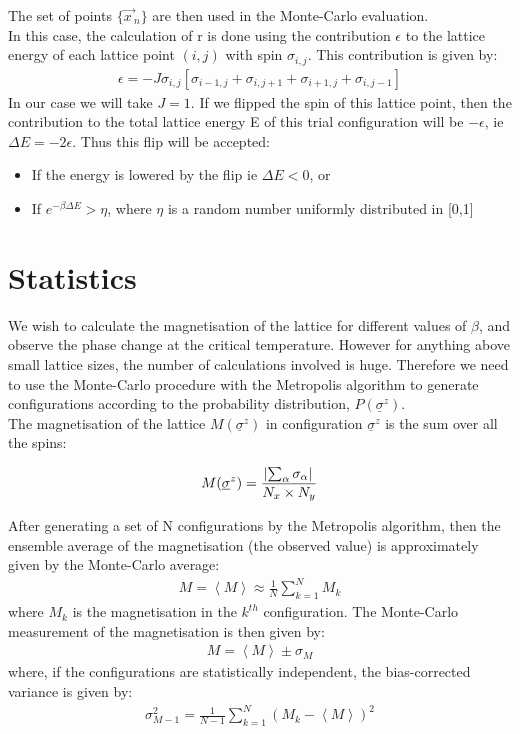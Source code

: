 \documentclass[a4paper]{article}
\begin{document}
\noindent The set of points $\{\overrightarrow{x\,}_n\}$ are then used in the Monte-Carlo evaluation.\\

\noindent In this case, the calculation of r is done using the contribution $\epsilon$ to the lattice energy of each lattice point $(i,j)$ with spin $\sigma_{i,j}$. This contribution is given by:
\begin{align}
	\epsilon=-J\sigma_{i,j}\left[\sigma_{i-1,j}+\sigma_{i,j+1}+\sigma_{i+1,j}+\sigma_{i,j-1}\right] \label{Eq_Metr_Alg_E}
\end{align}
In our case we will take $J=1$. If we flipped the spin of this lattice point, then the contribution to the total lattice energy E of this trial configuration will be $-\epsilon$, ie $\Delta E=-2\epsilon$. Thus this flip will be accepted:
\begin{itemize}
	\item If the energy is lowered by the flip ie $\Delta E<0$, or
	\item If $e^{-\beta\Delta E}>\eta$, where $\eta$ is a random number uniformly distributed in [0,1]
\end{itemize}

\section{Statistics}\label{Stats}
We wish to calculate the magnetisation of the lattice for different values of $\beta$, and observe the phase change at the critical temperature. However for anything above small lattice sizes, the number of calculations involved is huge. Therefore we need to use the Monte-Carlo procedure with the Metropolis algorithm to generate configurations according to the probability distribution, $P(\underline{\sigma}^z)$.\\

\noindent The magnetisation of the lattice $M(\underline{\sigma}^z)$ in configuration $\underline{\sigma}^z$ is the sum over all the spins:

\begin{align}
	M(\underline{\sigma}^z)=\frac{\abs*{\sum_{\alpha}\sigma_\alpha}}{N_x \times N_y}
\end{align}

\noindent After generating a set of N configurations by the Metropolis algorithm, then the ensemble average of the magnetisation (the observed value) is approximately given by the Monte-Carlo average:
\begin{align}
	M=\left<M\right>\approx\frac{1}{N}\sum_{k=1}^{N}M_k \label{M_C_avge}
\end{align}
where $M_k$ is the magnetisation in the $k^{th}$ configuration. The Monte-Carlo measurement of the magnetisation is then given by:
\begin{align}
	M=\left<M\right>\pm\sigma_M
\end{align}
where, if the configurations are statistically independent, the bias-corrected variance is given by:
\begin{align}
	\sigma^2_{M-1}=\frac{1}{N-1}\sum_{k=1}^{N}(M_k-\left<M\right>)^2 \label{M_C_var}
\end{align}
\end{document}
